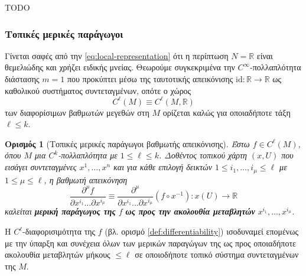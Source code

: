 \documentclass[11pt,a4paper,twoside,openright]{book}
\newtheorem{definition}[lemma]{Ορισμός}
\begin{document}
TODO

\subsubsection{Τοπικές μερικές παράγωγοι}
	\label{sec:local-partial-derivatives}

Γίνεται σαφές
από την \eqref{eq:local-representation}
ότι η περίπτωση $N = \mathbb{R}$ είναι θεμελιώδης και χρήζει ειδικής μνείας.
Θεωρούμε συγκεκριμένα την
$C^\infty$-πολλαπλότητα διάστασης $m=1$
που προκύπτει μέσω της ταυτοτικής απεικόνισης
$\mathrm{id}: \mathbb{R} \to \mathbb{R}$
ως καθολικού συστήματος συντεταγμένων,
οπότε ο χώρος
\begin{equation}
C^\ell(M) \equiv C^\ell(M, \mathbb{R})
\end{equation}
των διαφορίσιμων βαθμωτών μεγεθών στη $Μ$
ορίζεται καλώς για οποιαδήποτε τάξη $\ell \le k$.
\begin{definition}[Τοπικές μερικές παράγωγοι βαθμωτής απεικόνισης]\label{def:local-partial-derivative}
Έστω
$f \in C^\ell(M)$,
όπου $Μ$ μια $C^k$-πολλαπλότητα με $1 \le \ell \le k$.
Δοθέντος τοπικού χάρτη $(x, U)$ που εισάγει συντεταγμένες $x^1, \dots, x^n$ και
για κάθε επιλογή δεικτών $1 \le i_1, \dots, i_\mu \le \ell$
με $1 \le \mu \le \ell$,
η βαθμωτή απεικόνηση
\begin{equation}
\frac{\partial ^ \mu f}{\partial x^{i_1} \dots \partial x^{i_\mu}}
\equiv
\frac{\partial ^ \mu}{\partial x^{i_1} \dots \partial x^{i_\mu}} (f \circ x ^ {-1})
: x(U) \to \mathbb{R}
\end{equation}
καλείται \textbf{μερική παράγωγος της}
$f$ \textbf{ως προς την ακολουθία μεταβλητών}
$x^{i_1}, \dots, x^{i_\mu}$.
\end{definition}
\noindent
Η $C^\ell$-διαφορισιμότητα της $f$
(βλ. ορισμό \ref{def:differentiability})
ισοδυναμεί επομένως με την ύπαρξη και συνέχεια όλων των μερικών παραγώγων της ως προς οποιαδήποτε ακολουθία μεταβλητών μήκους $\le \ell$ σε οποιοδήποτε τοπικό σύστημα συντεταγμένων της $Μ$.
\end{document}
